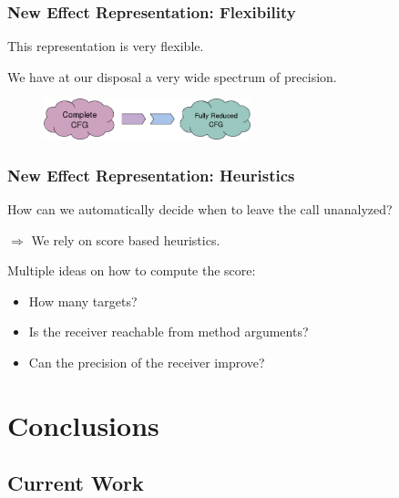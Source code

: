 \documentclass[hyperref={pdfpagelabels=false}]{beamer}
\begin{document}
\begin{frame}[fragile]
\frametitle{New Effect Representation: Flexibility}
    This representation is very flexible.

    We have at our disposal a very wide spectrum of precision.

    \vspace{15pt}

    \begin{figure}[t]
      \begin{center}
      \includegraphics[width=60mm]{images/spectrum.png}\\
      \end{center}
    \end{figure}
\end{frame}

\begin{frame}[fragile]
\frametitle{New Effect Representation: Heuristics}
    How can we automatically decide when to leave the call unanalyzed?

    \vspace{15pt}
    $\Rightarrow$ We rely on score based heuristics.

    \vspace{15pt}
    Multiple ideas on how to compute the score:
    \begin{itemize}
        \item How many targets?
        \item Is the receiver reachable from method arguments?
        \item Can the precision of the receiver improve?
    \end{itemize}
\end{frame}


\section{Conclusions}
\subsection{Current Work}
\end{document}
